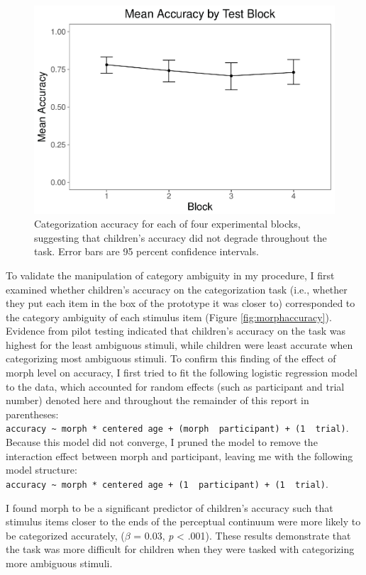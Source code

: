 \documentclass[floatsintext,man]{apa6}
\theoremstyle{definition}
\theoremstyle{definition}
\theoremstyle{definition}
\theoremstyle{remark}
\begin{document}
\begin{figure}
\centering
\includegraphics{soc_ref_category_paper_files/figure-latex/blockaccuracy-1.pdf}
\caption{\label{fig:blockaccuracy}Categorization accuracy for each of four
experimental blocks, suggesting that children's accuracy did not degrade
throughout the task. Error bars are 95 percent confidence intervals.}
\end{figure}

To validate the manipulation of category ambiguity in my procedure, I
first examined whether children's accuracy on the categorization task
(i.e., whether they put each item in the box of the prototype it was
closer to) corresponded to the category ambiguity of each stimulus item
(Figure \ref{fig:morphaccuracy}). Evidence from pilot testing indicated
that children's accuracy on the task was highest for the least ambiguous
stimuli, while children were least accurate when categorizing most
ambiguous stimuli. To confirm this finding of the effect of morph level
on accuracy, I first tried to fit the following logistic regression
model to the data, which accounted for random effects (such as
participant and trial number) denoted here and throughout the remainder
of this report in parentheses:
\texttt{accuracy\ \textasciitilde{}\ morph\ *\ centered\ age\ +\ (morph\ \textbar{}\ participant)\ +\ (1\ \textbar{}\ trial)}.
Because this model did not converge, I pruned the model to remove the
interaction effect between morph and participant, leaving me with the
following model structure:
\texttt{accuracy\ \textasciitilde{}\ morph\ *\ centered\ age\ +\ (1\ \textbar{}\ participant)\ +\ (1\ \textbar{}\ trial)}.

I found morph to be a significant predictor of children's accuracy such
that stimulus items closer to the ends of the perceptual continuum were
more likely to be categorized accurately, (\(\beta\) = 0.03, \emph{p}
\textless{} .001). These results demonstrate that the task was more
difficult for children when they were tasked with categorizing more
ambiguous stimuli.
\end{document}
